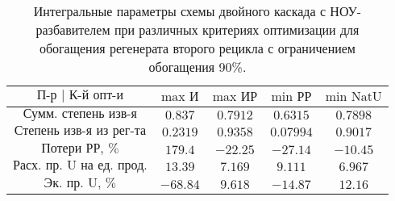 \begin{table}
\begin{tabular}{ccccc}
    $\text{П-р | К-й опт-и}$ & $\text{max И}$ & $\text{max ИР}$ & $\text{min РР}$ & $\text{min NatU}$\\ \hline
    $\text{Сумм. степень изв-я}$ & $0.837$ & $0.7912$ & $0.6315$ & $0.7898$\\ \hline
    $\text{Степень изв-я из рег-та}$ & $0.2319$ & $0.9358$ & $0.07994$ & $0.9017$\\ \hline        
    $\text{Потери РР, \%}$ & $179.4$ & $-22.25$ & $-27.14$ & $-10.45$\\ \hline
    $\text{Расх. пр. U на ед. прод.}$ & $13.39$ & $7.169$ & $9.111$ & $6.967$\\ \hline
    $\text{Эк. пр. U, \%}$ & $-68.84$ & $9.618$ & $-14.87$ & $12.16$
\end{tabular}
\caption{Интегральные параметры схемы двойного каскада с НОУ-разбавителем при различных критериях оптимизации для обогащения регенерата второго рецикла с ограничением обогащения 90\%.{\label{2opt2_90_int}}}
\end{table}

